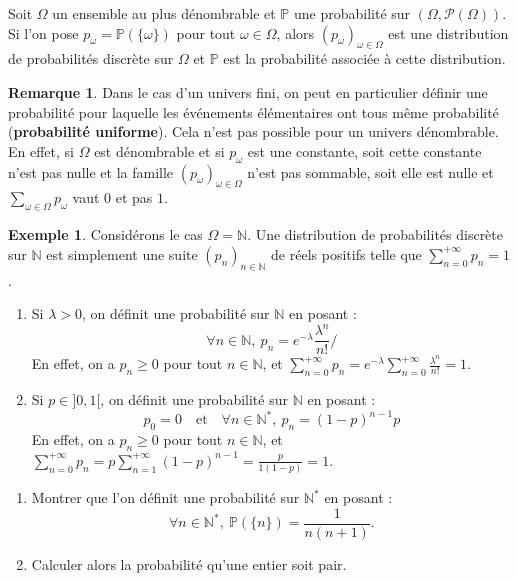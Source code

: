 \documentclass[french]{article}
\renewcommand{\P}{\mathbb{P}}
\newcommand{\N}{\mathbb{N}}
\newcommand{\st}{^*}
\theoremstyle{plain}
\theoremstyle{definition}
\newtheorem*{ex}{Exemple}
\newtheorem*{rmq}{Remarque}
\theoremstyle{remark}
\begin{document}
\begin{thm}%
	Soit $\Omega$ un ensemble au plus dénombrable et $\P$ une probabilité sur $(\Omega,\mathcal{P}(\Omega))$. Si l'on pose $p_\omega=\P(\{\omega\})$ pour tout $\omega\in\Omega$, alors $(p_\omega)_{\omega\in\Omega}$ est une distribution de probabilités discrète sur $\Omega$ et $\P$ est la probabilité associée à cette distribution.
\end{thm}

\begin{rmq}
	Dans le cas d'un univers fini, on peut en particulier définir une probabilité pour laquelle les événements élémentaires ont tous même probabilité (\textbf{probabilité uniforme}). Cela n'est pas possible pour un univers dénombrable. En effet, si $\Omega$ est dénombrable et si $p_\omega$ est une constante, soit cette constante n'est pas nulle et la famille $(p_\omega)_{\omega\in\Omega}$ n'est pas sommable, soit elle est nulle et $\displaystyle\sum_{\omega\in\Omega}p_\omega$ vaut $0$ et pas $1$.
\end{rmq}

\begin{ex}
	Considérons le cas $\Omega=\N$. Une distribution de probabilités discrète sur $\N$ est simplement une suite $(p_n)_{n\in\N}$ de réels positifs telle que $\displaystyle\sum_{n=0}^{+\infty}p_n=1$.
	\begin{enumerate}
		\item Si $\lambda>0$, on définit une probabilité sur $\N$ en posant : 
		$$\forall n\in\N,\ p_n=e^{-\lambda}\frac{\lambda^n}{n!}/$$
		En effet, on a $p_n\geqslant 0$ pour tout $n\in\N$, et $\displaystyle\sum_{n=0}^{+\infty}p_n=e^{-\lambda}\sum_{n=0}^{+\infty}\frac{\lambda^n}{n!}=1$.
		\item Si $p\in]0,1[$, on définit une probabilité sur $\N$ en posant : 
		$$p_0=0\quad\text{et}\quad\forall n\in\N\st,\ p_n=(1-p)^{n-1}p$$
		En effet, on a $p_n\geqslant 0$ pour tout $n\in\N$, et $\displaystyle\sum_{n=0}^{+\infty}p_n=p\sum_{n=1}^{+\infty}(1-p)^{n-1}=\frac{p}{1(1-p)}=1$.
	\end{enumerate}
\end{ex}

\begin{exo}
	\begin{enumerate}
		\item Montrer que l'on définit une probabilité sur $\N\st$ en posant : $$\forall n\in\N\st,\ \P(\{n\})=\frac{1}{n(n+1)}.$$
		\item Calculer alors la probabilité qu'une entier soit pair.
	\end{enumerate}
\end{exo}
\end{document}
